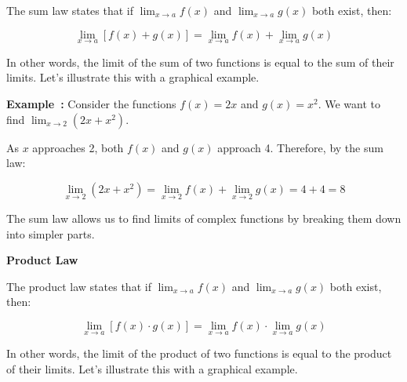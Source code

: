 \documentclass[a4paper,12pt]{book}
\newcounter{example}
\newenvironment{example}[1][\theexample]
  {\refstepcounter{example}\par\medskip\noindent\textbf{Example~#1:} \rmfamily}
  {\medskip}
\begin{document}
The sum law states that if \( \lim_{{x \to a}} f(x) \) and \( \lim_{{x \to a}} g(x) \) both exist, then:

\[
\lim_{{x \to a}} [f(x) + g(x)] = \lim_{{x \to a}} f(x) + \lim_{{x \to a}} g(x)
\]

In other words, the limit of the sum of two functions is equal to the sum of their limits. Let's illustrate this with a graphical example.

\begin{example}
Consider the functions \( f(x) = 2x \) and \( g(x) = x^2 \). We want to find \( \lim_{{x \to 2}} (2x + x^2) \).

\begin{center}
\end{center}

As \( x \) approaches 2, both \( f(x) \) and \( g(x) \) approach 4. Therefore, by the sum law:

\[
\lim_{{x \to 2}} (2x + x^2) = \lim_{{x \to 2}} f(x) + \lim_{{x \to 2}} g(x) = 4 + 4 = 8
\]
\end{example}

The sum law allows us to find limits of complex functions by breaking them down into simpler parts.

\textbf{Product Law}

The product law states that if \( \lim_{{x \to a}} f(x) \) and \( \lim_{{x \to a}} g(x) \) both exist, then:

\[
\lim_{{x \to a}} [f(x) \cdot g(x)] = \lim_{{x \to a}} f(x) \cdot \lim_{{x \to a}} g(x)
\]

In other words, the limit of the product of two functions is equal to the product of their limits. Let's illustrate this with a graphical example.
\end{document}
